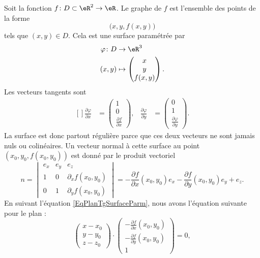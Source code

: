Soit la fonction $f\colon D\subset\eR^2\to \eR$. Le graphe de $f$ est l'ensemble des points de la forme
\begin{equation}
	\big( x,y,f(x,y) \big)
\end{equation}
tels que $(x,y)\in D$. Cela est une surface paramétrée par
\begin{equation}
	\begin{aligned}
		\varphi\colon D & \to \eR^3                           \\
		(x,y)           & \mapsto \begin{pmatrix}
			x \\
			y \\
			f(x,y)
		\end{pmatrix}.
	\end{aligned}
\end{equation}
Les vecteurs tangents sont
\begin{equation}
	\begin{aligned}[]
		\frac{ \partial \varphi }{ \partial x } & =\begin{pmatrix}
			1 \\
			0 \\
			\frac{ \partial f }{ \partial x }
		\end{pmatrix},
		                                        & \frac{ \partial \varphi }{ \partial y } & =\begin{pmatrix}
			0 \\
			1 \\
			\frac{ \partial \varphi }{ \partial y }
		\end{pmatrix}.
	\end{aligned}
\end{equation}
La surface est donc partout régulière parce que ces deux vecteurs ne sont jamais nuls ou colinéaires. Un vecteur normal à cette surface au point $(x_0,y_0,f(x_0,y_0))$ est donné par le produit vectoriel
\begin{equation}
	n=\begin{vmatrix}
		e_x & e_y & e_z                  \\
		1   & 0   & \partial_xf(x_0,y_0) \\
		0   & 1   & \partial_yf(x_0,y_0)
	\end{vmatrix}
	=-\frac{ \partial f }{ \partial x }(x_0,y_0)e_x-\frac{ \partial f }{ \partial y }(x_0,y_0)e_y+e_z.
\end{equation}
En suivant l'équation \eqref{EqPlanTgSurfaceParm}, nous avons l'équation suivante pour le plan :
\begin{equation}
	\begin{pmatrix}
		x-x_0 \\
		y-y_0 \\
		z-z_0
	\end{pmatrix}\cdot
	\begin{pmatrix}
		-\frac{ \partial f }{ \partial x }(x_0,y_0) \\
		-\frac{ \partial f }{ \partial y }(x_0,y_0) \\
		1
	\end{pmatrix}=0,
\end{equation}
